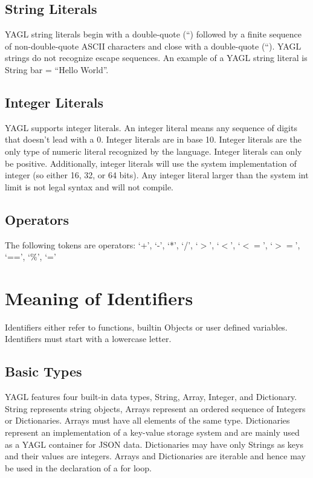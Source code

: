 \documentclass[12pt]{article}
\begin{document}
\subsection{String Literals}
YAGL string literals begin with a double-quote (“) followed by a finite sequence of non-double-quote ASCII characters and close with a double-quote (“). YAGL strings do not recognize escape sequences. An example of a YAGL string literal is String bar = “Hello World”.

\subsection{Integer Literals}
YAGL supports integer literals.  An integer literal means any sequence of digits that doesn’t lead with a 0.  Integer literals are in base 10.  Integer literals are the only type of numeric literal recognized by the language.  Integer literals can only be positive.  Additionally, integer literals will use the system implementation of integer (so either 16, 32, or 64 bits).  Any integer literal larger than the system int limit is not legal syntax and will not compile.

\subsection{Operators}
The following tokens are operators:
‘+’, ‘-’, ‘*’, ‘/’, ‘$>$’, ‘$<$’, ‘$<=$’, ‘$>=$’, ‘==’, ‘$\%$’, ‘=’

\section{Meaning of Identifiers}
Identifiers either refer to functions, builtin Objects or user defined variables.  Identifiers must start with a lowercase letter.

\subsection{Basic Types}
YAGL features four built-in data types, String, Array, Integer, and Dictionary. String represents string objects, Arrays represent an ordered sequence of Integers or Dictionaries. Arrays must have all elements of the same type.  Dictionaries represent an implementation of a key-value storage system and are mainly used as a YAGL container for JSON data. Dictionaries may have only Strings as keys and their values are integers. Arrays and Dictionaries are iterable and hence may be used in the declaration of a for loop. 
\end{document}

